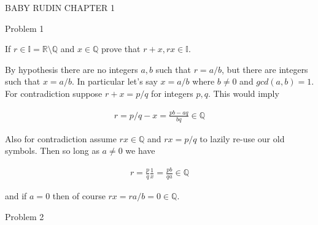 \documentclass{article}
\begin{document}
	\begin{center}
		\LARGE BABY RUDIN CHAPTER 1
	\end{center}

	{\Large Problem 1

	 If $r\in\mathbb{I}=\mathbb{R}\setminus \mathbb{Q}$ and $x\in\mathbb{Q}$ prove that $r+x, rx \in\mathbb{I}$.}

	By hypothesis there are no integers $a,b$ such that $r=a/b$, but there are integers such that $x=a/b$.  In particular let's say $x=a/b$ where $b\ne 0$ and $gcd(a,b)=1$.  For contradiction suppose $r+x = p/q$ for integers $p,q$.  This would imply 
	
	\begin{align*}
		r = p/q - x = \frac{pb-aq}{bq} \in \mathbb{Q}
	\end{align*}
	
	Also for contradiction assume $rx\in \mathbb{Q}$ and $rx = p/q$ to lazily re-use our old symbols.  Then so long as $a\ne 0$ we have
	
	\begin{align*}
		r = \frac{p}{q}\frac{1}{x} = \frac{pb}{qa} \in \mathbb{Q}
	\end{align*}
	
	and if $a=0$ then of course $rx = ra/b = 0\in\mathbb{Q}$.
	
	\pagebreak

	{\Large Problem 2}
	
	
\end{document}
